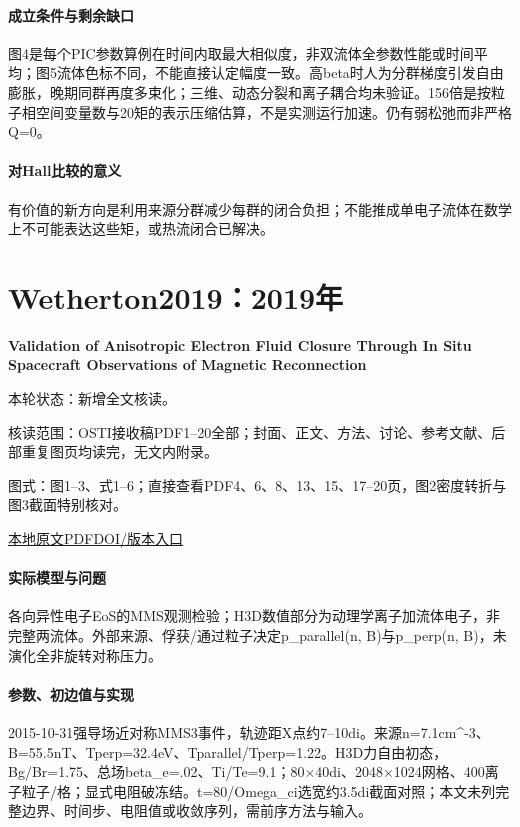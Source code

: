 \paragraph{成立条件与剩余缺口}图4是每个PIC参数算例在时间内取最大相似度，非双流体全参数性能或时间平均；图5流体色标不同，不能直接认定幅度一致。高beta时人为分群梯度引发自由膨胀，晚期同群再度多束化；三维、动态分裂和离子耦合均未验证。156倍是按粒子相空间变量数与20矩的表示压缩估算，不是实测运行加速。仍有弱松弛而非严格Q=0。

\paragraph{对Hall比较的意义}有价值的新方向是利用来源分群减少每群的闭合负担；不能推成单电子流体在数学上不可能表达这些矩，或热流闭合已解决。

\section{Wetherton2019：2019年}\label{paper:Wetherton2019}

\textbf{Validation of Anisotropic Electron Fluid Closure Through In Situ Spacecraft Observations of Magnetic Reconnection}\citep{Wetherton2019}

\textsf{本轮状态：}新增全文核读。

\textsf{核读范围：}OSTI接收稿PDF1–20全部；封面、正文、方法、讨论、参考文献、后部重复图页均读完，无文内附录。\par\textsf{图式：}图1–3、式1–6；直接查看PDF4、6、8、13、15、17–20页，图2密度转折与图3截面特别核对。

\href{run:../../papers/Wetherton2019.pdf}{本地原文PDF}\quad\href{https://doi.org/10.1029/2019GL083119}{DOI/版本入口}

\paragraph{实际模型与问题}各向异性电子EoS的MMS观测检验；H3D数值部分为动理学离子加流体电子，非完整两流体。外部来源、俘获/通过粒子决定p\_parallel(n, B)与p\_perp(n, B)，未演化全非旋转对称压力。

\paragraph{参数、初边值与实现}2015-10-31强导场近对称MMS3事件，轨迹距X点约7–10di。来源n=7.1cm\textasciicircum{}-3、B=55.5nT、Tperp=32.4eV、Tparallel/Tperp=1.22。H3D力自由初态，Bg/Br=1.75、总场beta\_e=.02、Ti/Te=9.1；80×40di、2048×1024网格、400离子粒子/格；显式电阻破冻结。t=80/Omega\_ci选宽约3.5di截面对照；本文未列完整边界、时间步、电阻值或收敛序列，需前序方法与输入。

